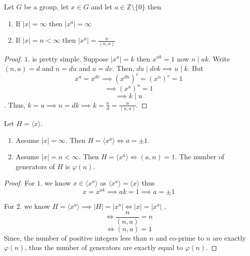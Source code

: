 \begin{proposition}
    Let $G$ be a group, let $x \in G$ and let $a \in \mathbb{Z}\setminus\{0\}$ then
    \begin{enumerate}
        \item If $|x|=\infty$ then $|x^a| = \infty$
        \item If $|x|=n < \infty$ then $|x^a|=\frac{n}{(n,a)}$
    \end{enumerate} 
\end{proposition}

\begin{proof}
    $1.$ is pretty simple. Suppose $|x^a|=k$ then $x^{ak}=1$ now $n \mid ak$.
    Write $(n,a)=d$ and $n=du$ and $a=dv$. Then, $du \mid dvk \implies u \mid k$. But
    \[ x^a = x^{dv} \implies (x^{du})^v = (x^{n})^v = 1  \]
    \[ \implies (x^{a})^u=1 \]
    \[ \implies k \mid u \]. 
    Thus, $k=u \implies n=dk \implies k = \frac{n}{d} = \frac{n}{(n,a)}$.
\end{proof}


\begin{proposition}
    Let $H=\langle x \rangle$. 
    \begin{enumerate}
        \item Assume $|x|= \infty$. Then $H = \langle x^a \rangle \iff a = \pm 1$.
        \item Assume $|x|=n < \infty$. Then $H = \langle x^a \rangle \iff (a,n)=1$.
            The number of generators of $H$ is $\varphi(n)$.  
    \end{enumerate}
\end{proposition}

\begin{proof}
    For $1.$ we know $x \in \langle x^a \rangle$ as $\langle x^a \rangle = \langle x \rangle$ thus 
    \[ x=x^{ak} \implies ak = 1 \implies a = \pm 1 \]
    
    For $2.$ we know $H=\langle x^a \rangle \implies |H|=|x^a| \iff |x|=|x^a|$ ,
    \[ \iff \frac{n}{(n,a)}=n \]
    \[ \iff (n,a)=1 \]
    Since, the number of positive integers less than $n$ and co-prime to $n$ are exactly $\varphi(n)$, thus the number of generators are
    exactly equal to $\varphi(n)$.
\end{proof}

